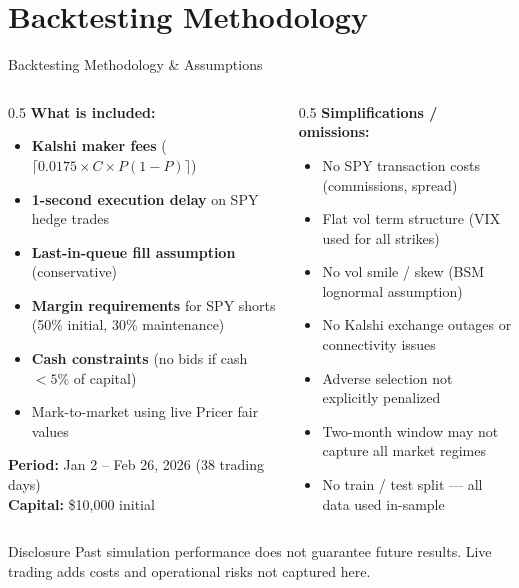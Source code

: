 \documentclass[aspectratio=169]{beamer}
\begin{document}
\section{Backtesting Methodology}

\begin{frame}[shrink=5]{Backtesting Methodology \& Assumptions}
  \begin{columns}[T,onlytextwidth]
    \begin{column}{0.5\textwidth}
      \textbf{What is included:}
      \begin{itemize}\small
        \item \textbf{Kalshi maker fees} ($\lceil 0.0175 \times C \times P(1-P)\rceil$)
        \item \textbf{1-second execution delay} on SPY hedge trades
        \item \textbf{Last-in-queue fill assumption} (conservative)
        \item \textbf{Margin requirements} for SPY shorts (50\% initial, 30\% maintenance)
        \item \textbf{Cash constraints} (no bids if cash $<5\%$ of capital)
        \item Mark-to-market using live Pricer fair values
      \end{itemize}
      \vspace{0.3em}
      \small\textbf{Period:} Jan 2 -- Feb 26, 2026 (38 trading days)\\
      \textbf{Capital:} \$10,000 initial
    \end{column}
    \begin{column}{0.5\textwidth}
      \textbf{Simplifications / omissions:}
      \begin{itemize}\small
        \item No SPY transaction costs (commissions, spread)
        \item Flat vol term structure (VIX used for all strikes)
        \item No vol smile / skew (BSM lognormal assumption)
        \item No Kalshi exchange outages or connectivity issues
        \item Adverse selection not explicitly penalized
        \item Two-month window may not capture all market regimes
        \item No train / test split --- all data used in-sample
      \end{itemize}
      \vspace{0.2em}
    \end{column}
  \end{columns}
  \begin{alertblock}{Disclosure}
        \footnotesize Past simulation performance does not guarantee future results.
        Live trading adds costs and operational risks not captured here.
      \end{alertblock}
\end{frame}
\end{document}
